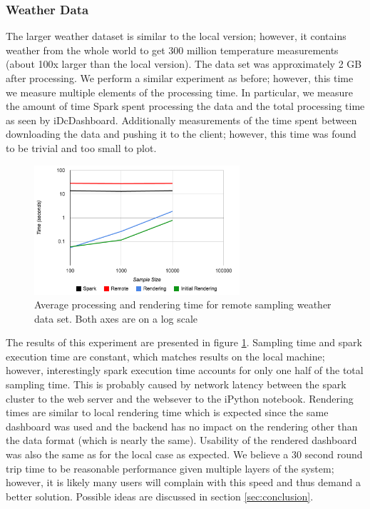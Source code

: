 \documentclass[letter,twocolumn]{article}
\begin{document}
\subsubsection{Weather Data}

The larger weather dataset is similar to the local version; however, it contains weather from the whole world to get 300 million temperature measurements (about 100x larger than the local version).  
The data set was approximately 2 GB after processing.
We perform a similar experiment as before; however, this time we measure multiple elements of the processing time.
In particular, we measure the amount of time Spark spent processing the data and the total processing time as seen by iDcDashboard.
Additionally measurements of the time spent between downloading the data and pushing it to the client; however, this time was found to be trivial and too small to plot.

\begin{figure}
\begin{center}
\includegraphics[width=3in]{figs/weather_big_perf.png}
\end{center}
\caption{Average processing and rendering time for remote sampling weather data set.  Both axes are on a log scale}\label{fig:weather_big_perf}
\end{figure}

The results of this experiment are presented in figure \ref{fig:weather_big_perf}.
Sampling time and spark execution time are constant, which matches results on the local machine;
however, interestingly spark execution time accounts for only one half of the total sampling time.  
This is probably caused by network latency between the spark cluster to the web server and the websever to the iPython notebook.
Rendering times are similar to local rendering time which is expected since the same dashboard was used and the backend has no impact on the rendering other than the data format (which is nearly the same).
Usability of the rendered dashboard was also the same as for the local case as expected.
We believe a 30 second round trip time to be reasonable performance given multiple layers of the system; however, it is likely many users will complain with this speed and thus demand a better solution.
Possible ideas are discussed in section \ref{sec:conclusion}.
\end{document}
